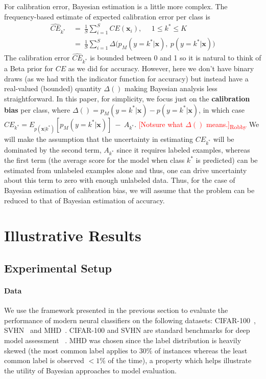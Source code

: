 \documentclass{article}
\newcommand{\ux}{{\mathbf{x}}}
\newcommand{\robby}[1]{\textcolor{Red}{[#1]\textsubscript{Robby}}}
\begin{document}
For calibration error, Bayesian estimation is a little more complex.
The frequency-based estimate of expected calibration error per class is  
\begin{align*}
\hat{CE}_{k^*} & \ = \  \frac{1}{S} \sum_{i=1}^S CE(\ux_i), \ \  \ \ \ \ 1 \le k^* \le K \\
 &  \ = \  \frac{1}{S} \sum_{i=1}^S \Delta\bigl(p_M(y = k^*| \ux), \  p(y =k^*| \ux)  \bigr) 
\end{align*}
The calibration error $\hat{CE}_{k^*}$ is bounded between 0 and 1 so it is natural to think of a Beta prior for $CE$ as we did for accuracy.
However, here we don't have binary draws (as we had with the indicator function for accuracy) but instead have a real-valued (bounded) quantity $\Delta(  )$ making Bayesian analysis less straightforward.
In this paper, for simplicity, we focus just on the {\bf calibration bias}  per class, where  $\Delta( ) = p_M(y = k^*| \ux) - p(y =k^*| \ux)$, in which case 
$CE_{k^*} = %
E_{p(\ux|k^*)}[ p_M(y = k^*| \ux)] \ - \  {A}_{k^*} $.
\robby{Notsure what $\Delta(  )$ means.}
We will make the assumption that the uncertainty in estimating $CE_{k^*}$ will be dominated by the second term, ${A}_{k^*}$ since it requires labeled examples, whereas the first term (the average score for the model when class $k^*$ is predicted) can be estimated from unlabeled examples alone and thus, one can drive uncertainty about this term to zero with enough unlabeled data. Thus, for the case of Bayesian estimation of calibration bias, we will assume that the problem can be reduced to that of Bayesian estimation of accuracy.

 



\section{Illustrative Results}


\subsection{Experimental Setup}

\paragraph{Data} 
We use the framework presented in the previous section to evaluate the performance of modern neural classifiers on the following datasets: 
    CIFAR-100~\cite{krizhevsky2009learning},
    SVHN~\cite{netzer2011reading} and
    MHD~\cite{tai_seale2016mhd}.
CIFAR-100 and SVHN are standard benchmarks for deep model assessment ~\cite{guo2017calibration, hendrycks2019benchmarking}.
MHD was chosen since the label distribution is heavily skewed (the most common label applies to $30\%$ of instances whereas the least common label is observed $<1\%$ of the time), a property which helps illustrate the utility of Bayesian approaches to model evaluation.
\end{document}
